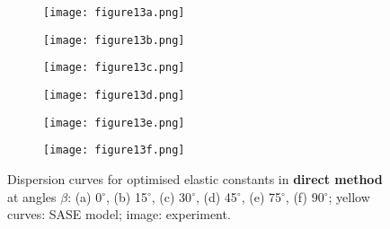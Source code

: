 \documentclass[preprint,12pt]{elsarticle}
\providecommand{\DIFdelend}{} %
\providecommand{\DIFaddbeginFL}{} %
\providecommand{\DIFaddendFL}{} %
\providecommand{\DIFdelbeginFL}{} %
\providecommand{\DIFdelendFL}{} %
\begin{document}
\DIFdelend \begin{figure} [h!]
	\DIFdelbeginFL %
\DIFdelendFL \DIFaddbeginFL 
	\DIFaddendFL \centering
	\begin{subfigure}[b]{0.49\textwidth}
		\centering
		\DIFdelbeginFL %
\DIFdelendFL \DIFaddbeginFL \texttt{[image: figure13a.png]}
		\DIFaddendFL \caption{}
		\label{fig:dispersion0deg_direct}
	\end{subfigure}
	\begin{subfigure}[b]{0.49\textwidth}
		\centering
		\DIFdelbeginFL %
\DIFdelendFL \DIFaddbeginFL \texttt{[image: figure13b.png]}
		\DIFaddendFL \caption{}
		\label{fig:dispersion15deg_direct}
	\end{subfigure}
	\begin{subfigure}[b]{0.49\textwidth}
		\centering
		\DIFdelbeginFL %
\DIFdelendFL \DIFaddbeginFL \texttt{[image: figure13c.png]}
		\DIFaddendFL \caption{}
		\label{fig:dispersion30deg_direct}
	\end{subfigure}
	\begin{subfigure}[b]{0.49\textwidth}
		\centering
		\DIFdelbeginFL %
\DIFdelendFL \DIFaddbeginFL \texttt{[image: figure13d.png]}
		\DIFaddendFL \caption{}
		\label{fig:dispersion45deg_direct}
	\end{subfigure}
	\begin{subfigure}[b]{0.49\textwidth}
		\centering
		\DIFdelbeginFL %
\DIFdelendFL \DIFaddbeginFL \texttt{[image: figure13e.png]}
		\DIFaddendFL \caption{}
		\label{fig:dispersion75deg_direct}
	\end{subfigure}
	\begin{subfigure}[b]{0.49\textwidth}
		\centering
		\DIFdelbeginFL %
\DIFdelendFL \DIFaddbeginFL \texttt{[image: figure13f.png]}
		\DIFaddendFL \caption{}
		\label{fig:dispersion90deg_direct}
	\end{subfigure}
	\caption{Dispersion curves for optimised elastic constants in \textbf{direct method} at angles $\beta$: (a) 0$^{\circ}$, (b) 15$^{\circ}$, (c) 30$^{\circ}$, (d) 45$^{\circ}$, (e) 75$^{\circ}$, (f) 90$^{\circ}$; yellow curves: SASE model; image: experiment. }
	\label{fig:optimized_direct}
\end{figure}
\end{document}
